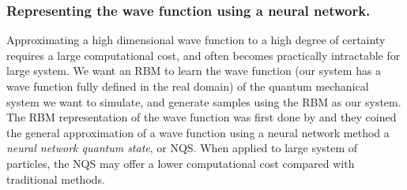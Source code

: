 \subsubsection{Representing the wave function using a neural network.}
Approximating a high dimensional wave function to a high degree of certainty requires a large computational cost, and often becomes practically intractable for large system. We want an RBM to learn the wave function (our system has a wave function fully defined in the real domain) of the quantum mechanical system we want to simulate, and generate samples using the RBM as our system. The RBM representation of the wave function was first done by \citep{Carleo_2017} and they coined the general approximation of a wave function using a neural network method a \textit{neural network quantum state}, or NQS. When applied to large system of particles, the NQS may offer a lower computational cost compared with traditional methods. %

